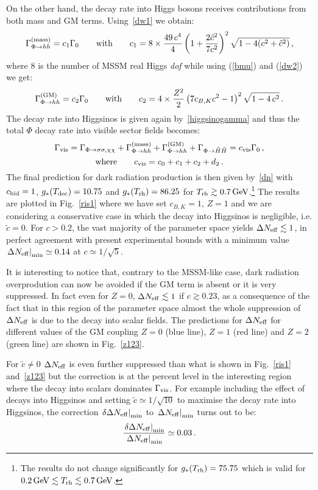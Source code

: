 \documentclass[11pt,a4paper]{article}
\newcommand{\be}{\begin{equation}}
\newcommand{\ee}{\end{equation}}
\begin{document}
On the other hand, the decay rate into Higgs bosons receives contributions from both mass and GM terms. Using~\eqref{dw1} we obtain:
\be
\Gamma^{\rm (mass)}_{\Phi \rightarrow hh} = c_1 \Gamma_0\qquad\text{with}\qquad c_1 = 8 \times \frac{49 \, c^4}{4} \left(1+\frac{2\tilde{c}^2}{7 c^2}\right)^2\sqrt{1 - 4 (c^2+\tilde{c}^2)}\,, 
\ee
where $8$ is the number of MSSM real Higgs \textit{dof} while using (\ref{bmu}) and (\ref{dw2}) we get:
\be
\Gamma^{\rm (GM)}_{\Phi \rightarrow hh} = c_2 \Gamma_0\qquad\text{with}\qquad c_2 = 4\times\frac{Z^2}{2} \left(7 c_{B,K} c^2  - 1 \right)^2 \sqrt{1 - 4\,c^2}\,.
\ee
The decay rate into Higgsinos is given again by~\eqref{higgsinogamma} and thus the total $\Phi$ decay rate into visible sector fields becomes:
\be
\Gamma_{\rm vis} = \Gamma_{\Phi \rightarrow \sigma\sigma,\chi\chi}+\Gamma^{\rm (mass)}_{\Phi \rightarrow hh}+\Gamma^{\rm (GM)}_{\Phi \rightarrow hh}+\Gamma_{\Phi \rightarrow \tilde{H}\tilde{H}}= c_{\rm vis} \Gamma_0 \,,
\ee
\be
\text{where}\qquad c_{\rm vis} = c_0 + c_1 + c_2 + d_2 \,.
\ee
The final prediction for dark radiation production is then given by~\eqref{dn} with $c_{\rm hid}=1$, $g_*(T_{\rm dec}) = 10.75$ and $g_*(T_{\rm rh}) = 86.25$ for $T_{\rm rh} \gtrsim 0.7\,{\rm GeV}$.\footnote{The results do not change significantly for $g_*(T_{\rm rh}) = 75.75$ which is valid for $0.2\,{\rm GeV} \lesssim T_{\rm rh} \lesssim 0.7\, {\rm GeV}$.} The results are plotted in Fig.~\ref{ris1} where we have set $c_{B,K}=1$, $Z = 1$ and we are considering a conservative case in which the decay into Higgsinos is negligible, i.e. $\tilde{c} = 0$. For $c>0.2$, the vast majority of the parameter space yields $\Delta N_{\rm eff} \lesssim 1$, in perfect agreement with present experimental bounds with a minimum value $\left.\Delta N_{\rm eff}\right|_{\rm min} \simeq 0.14$ at $c \simeq 1/\sqrt{5}$.

It is interesting to notice that, contrary to the MSSM-like case, dark radiation overprodution can now be avoided if the GM term is absent or it is very suppressed. In fact even for $Z=0$, $\Delta N_{\rm eff} \lesssim 1$ if $c\gtrsim 0.23$, as a consequence of the fact that in this region of the parameter space almost the whole suppression of $\Delta N_{\rm eff}$ is due to the decay into scalar fields. The predictions for $\Delta N_{\rm eff}$ for different values of the GM coupling $Z = 0$ (blue line), $Z = 1$ (red line) and $Z = 2$ (green line) are shown in Fig.~\ref{z123}. 

For $\tilde{c} \neq 0$ $\Delta N_{\rm eff}$ is even further suppressed than what is shown in Fig.~\ref{ris1} and~\ref{z123} but the correction is at the percent level in the interesting region where the decay into scalars dominates $\Gamma_{\rm vis}$. For example including the effect of decays into Higgsinos and setting $\tilde{c} \simeq 1/\sqrt{10}$ to maximise the decay rate into Higgsinos, the correction $\left.\delta \Delta N_{\rm eff}\right|_{\rm min}$ to $\left.\Delta N_{\rm eff}\right|_{\rm min}$ turns out to be:
\be
\frac{\left.\delta \Delta N_{\rm eff}\right|_{\rm min}}{\left.\Delta N_{\rm eff}\right|_{\rm min}} \simeq 0.03 \,.
\ee
\end{document}
